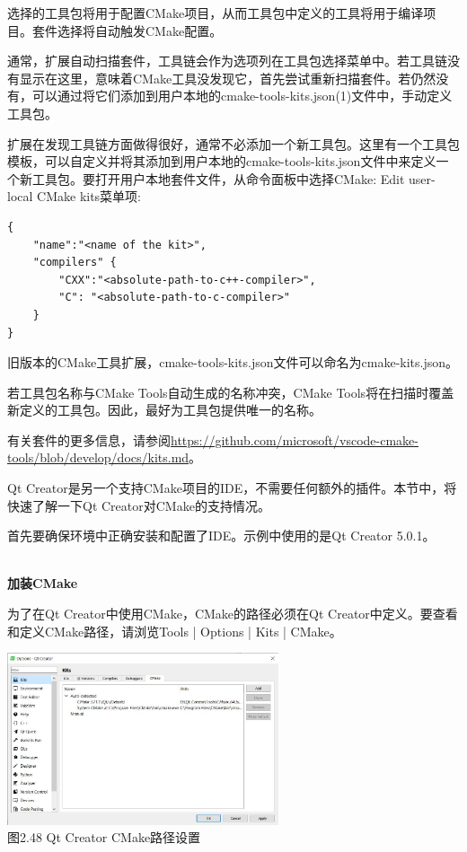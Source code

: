选择的工具包将用于配置CMake项目，从而工具包中定义的工具将用于编译项目。套件选择将自动触发CMake配置。

通常，扩展自动扫描套件，工具链会作为选项列在工具包选择菜单中。若工具链没有显示在这里，意味着CMake工具没发现它，首先尝试重新扫描套件。若仍然没有，可以通过将它们添加到用户本地的cmake-tools-kits.json(1)文件中，手动定义工具包。

扩展在发现工具链方面做得很好，通常不必添加一个新工具包。这里有一个工具包模板，可以自定义并将其添加到用户本地的cmake-tools-kits.json文件中来定义一个新工具包。要打开用户本地套件文件，从命令面板中选择CMake: Edit user-local CMake kits菜单项:

\begin{lstlisting}[style=styleCMake]
{
	"name":"<name of the kit>",
	"compilers" {
		"CXX":"<absolute-path-to-c++-compiler>",
		"C": "<absolute-path-to-c-compiler>"
	}
}
\end{lstlisting}

\begin{tcolorbox}[colback=webgreen!5!white,colframe=webgreen!75!black,title=Note]
旧版本的CMake工具扩展，cmake-tools-kits.json文件可以命名为cmake-kits.json。
\end{tcolorbox}

若工具包名称与CMake Tools自动生成的名称冲突，CMake Tools将在扫描时覆盖新定义的工具包。因此，最好为工具包提供唯一的名称。

有关套件的更多信息，请参阅\url{https://github.com/microsoft/vscode-cmake-tools/blob/develop/docs/kits.md}。


Qt Creator是另一个支持CMake项目的IDE，不需要任何额外的插件。本节中，将快速了解一下Qt Creator对CMake的支持情况。

首先要确保环境中正确安装和配置了IDE。示例中使用的是Qt Creator 5.0.1。

\hspace*{\fill} \\ %
\noindent
\textbf{加装CMake}

为了在Qt Creator中使用CMake，CMake的路径必须在Qt Creator中定义。要查看和定义CMake路径，请浏览Tools | Options | Kits | CMake。

\begin{center}
\includegraphics[width=0.6\textwidth]{content/1/chapter2/images/48.jpg}\\
图2.48 Qt Creator CMake路径设置
\end{center}

